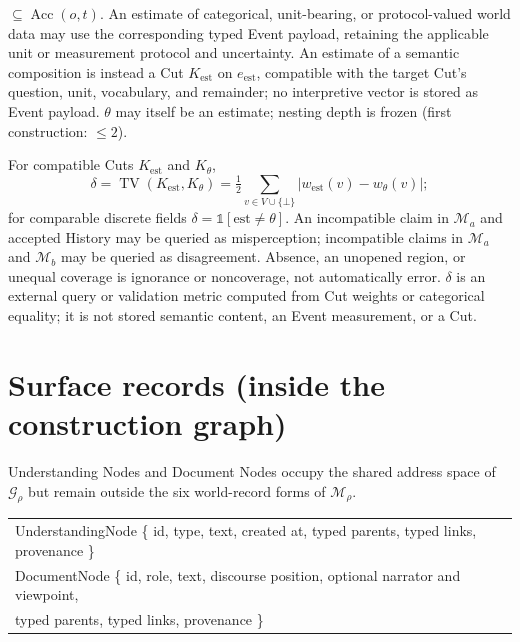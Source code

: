 \documentclass[11pt,a4paper]{article}
\newcommand{\tv}{\operatorname{TV}}
\begin{document}
\begin{description}
    $\subseteq\operatorname{Acc}(o,t)$. An estimate of categorical,
    unit-bearing, or protocol-valued world data may use the corresponding typed
    Event payload, retaining the applicable unit or measurement protocol and
    uncertainty. An estimate of a
    semantic composition is instead a Cut $K_{\mathrm{est}}$ on
    $e_{\mathrm{est}}$, compatible with the target Cut's question, unit,
    vocabulary, and remainder; no interpretive vector is stored as Event
    payload. $\theta$ may itself be an estimate; nesting depth is frozen
    (first construction: $\le 2$).
  \item[Q5 Divergence (derived).] For compatible Cuts $K_{\mathrm{est}}$ and
    $K_\theta$,
    \begin{equation}
      \delta=\tv(K_{\mathrm{est}},K_\theta)=\tfrac12\sum_{v\in V\cup\{\bot\}}
      \bigl|w_{\mathrm{est}}(v)-w_\theta(v)\bigr|;
    \end{equation}
    for comparable discrete fields $\delta=\mathbb{1}[\text{est}\ne\theta]$.
    An incompatible claim in $\mathcal M_a$ and accepted History may be queried
    as misperception; incompatible claims in $\mathcal M_a$ and
    $\mathcal M_b$ may be queried as disagreement. Absence, an unopened region,
    or unequal coverage is ignorance or noncoverage, not automatically error.
    $\delta$ is an external query or validation metric computed
    from Cut weights or categorical equality; it is not stored semantic
    content, an Event measurement, or a Cut.
\end{description}

\section{Surface records (inside the construction graph)}

Understanding Nodes and Document Nodes occupy the shared address space of $\mathcal G_\rho$ but
remain outside the six world-record forms of $\mathcal M_\rho$.

\begin{center}
\footnotesize\ttfamily
\begin{tabular}{@{}l@{}}
UnderstandingNode \{ id, type, text, created at, typed parents, typed links, provenance \}\\
DocumentNode \{ id, role, text, discourse position, optional narrator and viewpoint,\\
\qquad typed parents, typed links, provenance \}
\end{tabular}
\end{center}
\end{document}
